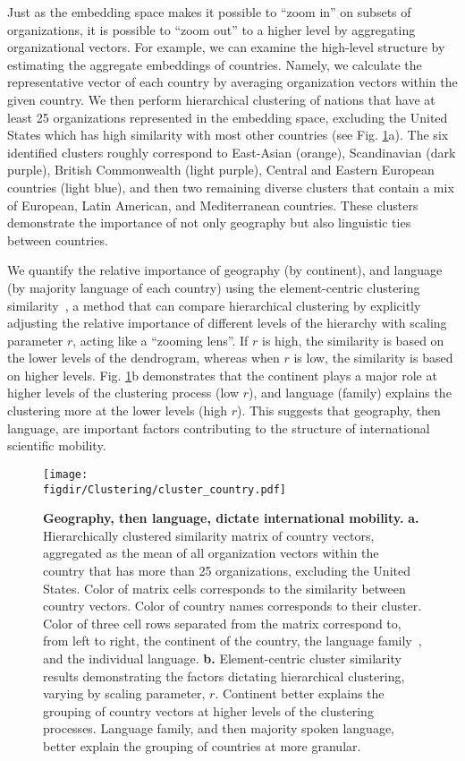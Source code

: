 \documentclass[12pt]{article} %
\def\figdir{../Figs}
\begin{document}
Just as the embedding space makes it possible to ``zoom in'' on subsets of organizations, it is possible to ``zoom out'' to a higher level by aggregating organizational vectors. 
For example, we can examine the high-level structure by estimating the aggregate embeddings of countries. 
Namely, we calculate the representative vector of each country by averaging organization vectors within the given country.
We then perform hierarchical clustering of nations that have at least 25 organizations represented in the embedding space, excluding the United States which has high similarity with most other countries (see Fig. \ref{fig:clustering}a). 
The six identified clusters roughly correspond to East-Asian (orange), Scandinavian (dark purple), British Commonwealth (light purple), Central and Eastern European countries (light blue), and then two remaining diverse clusters that contain a mix of European, Latin American, and Mediterranean countries.
These clusters demonstrate the importance of not only geography but also linguistic ties between countries.

We quantify the relative importance of geography (by continent), and language (by majority language of each country) using the element-centric clustering similarity~\autocite{gates2019element}, a method that can compare hierarchical clustering by explicitly adjusting the relative importance of different levels of the hierarchy with scaling parameter $r$, acting like a ``zooming lens''.
If $r$ is high, the similarity is based on the lower levels of the dendrogram, whereas when $r$ is low, the similarity is based on higher levels.
Fig. \ref{fig:clustering}b demonstrates that the continent plays a major role at higher levels of the clustering process (low $r$), and language (family) explains the clustering more at the lower levels (high $r$).
This suggests that geography, then language, are important factors contributing to the structure of international scientific mobility.


%
%
\begin{figure}[p!]
	\centering
	\texttt{[image: \\figdir/Clustering/cluster\_country.pdf]}
	\caption{
		\textbf{Geography, then language, dictate international mobility.}
		\textbf{a.} Hierarchically clustered similarity matrix of country vectors, aggregated as the mean of all organization vectors within the country that has more than 25 organizations, excluding the United States.
		Color of matrix cells corresponds to the similarity between country vectors.
		Color of country names corresponds to their cluster.
		Color of three cell rows separated from the matrix correspond to, from left to right, the continent of the country, the language family~\autocite{ethnologue}, and the individual language.
		\textbf{b.}	Element-centric cluster similarity~\autocite{gates2019element} results demonstrating the factors dictating hierarchical clustering, varying by scaling parameter, $r$.
		Continent better explains the grouping of country vectors at higher levels of the clustering processes.
		Language family, and then majority spoken language, better explain the grouping of countries at more granular.
	}
	\label{fig:clustering}
\end{figure}
\end{document}
